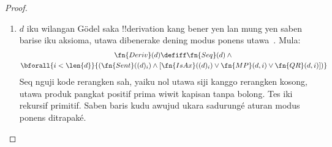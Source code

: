 \documentclass[../../../include/open-logic-section]{subfiles}
\begin{document}
\begin{proof}
\begin{enumerate}
  kang awujud $!B \lif !A(c)$ kanggo sawijining !!{constant}~$c$,
  lan $c$ ora ana ing~$!B$. Iki lumaku yen lan mung yen
  \begin{enumerate}
  \item ana !!a{sentence}~$!B$ lan
  \item !!a{formula}~$!A(x)$ kang variabel bebas, yen ana, mung~$x$,
    saengga
  \item baris $i$ ngemot $!B \lif \lforall[x][!A(x)]$,
  \item sawijining baris $j < i$ ngemot $!B \lif \Subst{!A}{c}{x}$
    kanggo sawijining konstanta~$c$,
  \item kang ora ana ing~$!B$.
  \end{enumerate}
  Kabeh iki bisa dipriksa kanthi rekursif primitif, amarga wilangan
  G\"odel saka $!B$, $!A(x)$, lan $x$ luwih cilik tinimbang
  wilangan G\"odel saka formula ing baris~$i$, lan wilangan
  kode saka $c$ luwih cilik tinimbang wilangan G\"odel
  saka formula ing baris~$j$:
  \begin{multline*}
    \fn{QR}_1(d, i) \defiff
    \bexists{j<i}{\bexists{b < (d)_i}{\bexists{x < (d)_i}{
      \bexists{a < (d)_i}{\bexists{c < (d)_j}{
        \fn{Frm}(a) \land \fn{Var}(x) \land \fn{Const}(c) \land {}\\
        (d)_i = \Gn{(} \concat b \concat \Gn{\lif}
        \concat \Gn{\lforall} \concat x \concat a
        \concat \Gn{)} \land {}\\
        (d)_j = \Gn{(} \concat b \concat \Gn{\lif}
        \concat \fn{Subst}(a,c,x) \concat \Gn{)} \land {}\\
        \fn{Sent}(b) \land \fn{Sent}(\fn{Subst}(a,c,x)) \land {}
        \bforall{k < \len{b}}{(b)_k \neq (c)_0}}}}}}
  \end{multline*}
  Ing kene kita nganggep $c$ lan $x$ minangka wilangan G\"odel
  saka konstanta lan variabel kang dianggep suku (dudu kode
  simbule). Kita mriksa yen $x$ iku siji-sijine variabel bebas
  ing~$!A(x)$ kanthi mriksa apa $\Subst{!A(x)}{c}{x}$ iku
  !!a{sentence}, lan mesthekake yen $c$ ora ana ing $!B$
  kanthi mbutuhake saben simbol ing~$!B$ beda karo~$(c)_0$.

  Versi liyane saka \QR{} kita pasrahake dadi gladhen.
\item $d$ iku wilangan G\"odel saka !!{derivation} kang bener
  yen lan mung yen saben barise iku aksioma, utawa dibenerake
  dening modus ponens utawa~\QR. Mula:
  \begin{multline*}
  \fn{Deriv}(d) \defiff \fn{Seq}(d) \land {}\\
  \bforall{i < \len{d}}{(\fn{Sent}((d)_i) \land
    [\fn{IsAx}((d)_i) \lor \fn{MP}(d,i) \lor \fn{QR}(d, i)])}
  \end{multline*}
Seq nguji kode rerangken sah, yaiku nol utawa siji kanggo rerangken kosong, utawa produk pangkat positif prima wiwit kapisan tanpa bolong. Tes iki rekursif primitif. Saben baris kudu awujud ukara sadurungé aturan modus ponens ditrapaké.
\end{enumerate}
\end{proof}
\end{document}

